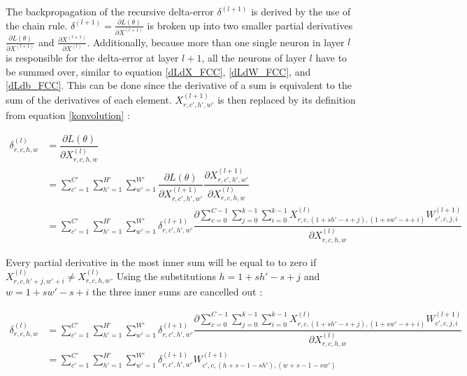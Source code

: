\documentclass[a4paper, twoside]{article}
\newcommand*{\pd}[2]{\ensuremath{\dfrac{\partial #1}{\partial #2}}}
\newcommand*{\inpd}[2]{\ensuremath{\frac{\partial #1}{\partial #2}}}
\begin{document}
The backpropagation of the recursive delta-error $\delta^{(l+1)}$ is derived by the use of the chain rule. $\delta^{(l+1)} = \inpd{L(\theta)}{X^{(l+1)}}$ is broken up into two smaller partial derivatives $\inpd{L(\theta)}{X^{(l+1)}}$ and $\inpd{X^{(l+1)}}{X^{(l)}}$. Additionally, because more than one single neuron in layer $l$ is responsible for the delta-error at layer $l+1$, all the neurons of layer $l$ have to be summed over, similar to equation \eqref{dLdX_FCC}, \eqref{dLdW_FCC}, and \eqref{dLdb_FCC}. This can be done since the derivative of a sum is equivalent to the sum of the derivatives of each element. $X^{(l+1)}_{r,c',h',w'}$ is then replaced by its definition from equation \eqref{konvolution} \cite{convmath} \cite{webconv1} \cite{webconv2} \cite{webconv3}: 

\begin{equation}\label{konvolutionbackprop}
\begin{split}
	\delta^{(l)}_{r,c,h,w}
		& = \pd{L(\theta)}{X^{(l)}_{r,c,h,w}} \\
		& = \sum^{C' }_{c'=1} \sum^{H' }_{h'=1} \sum^{W' }_{w'=1} \pd{L(\theta)}{X^{(l+1)}_{r,c',h',w'}} \pd{X^{(l+1)}_{r,c',h',w'}}{X^{(l)}_{r,c,h,w}} \\
		& = \sum^{C' }_{c'=1} \sum^{H' }_{h'=1} \sum^{W' }_{w'=1} \delta^{(l+1)}_{r,c',h',w'} \pd{\sum^{C-1 }_{c=0} \sum^{k-1 }_{j=0} \sum^{k-1 }_{i=0} X^{(l)}_{r, c, (1+sh'-s+j), (1+sw'-s+i)}W^{(l+1)}_{c', c, j, i}}{X^{(l)}_{r,c,h,w}}
\end{split}
\end{equation}

Every partial derivative in the most inner sum will be equal to to zero if $X^{(l)}_{r, c, h'+j, w'+i} \neq X^{(l)}_{r,c,h,w}$. Using the substitutions $h = 1+sh'-s+j$ and $w = 1+sw'-s+i$ the three inner sums are cancelled out \cite{webconv1} \cite{webconv2} \cite{webconv3}:

\begin{equation}
\begin{split}
	\delta^{(l)}_{r,c,h,w}
		& = \sum^{C' }_{c'=1} \sum^{H' }_{h'=1} \sum^{W' }_{w'=1} \delta^{(l+1)}_{r,c',h',w'} \pd{\sum^{C-1 }_{c=0} \sum^{k-1 }_{j=0} \sum^{k-1 }_{i=0} X^{(l)}_{r, c, (1+sh'-s+j), (1+sw'-s+i)}W^{(l+1)}_{c', c, j, i}}{X^{(l)}_{r,c,h,w}} \\
		& = \sum^{C' }_{c'=1} \sum^{H' }_{h'=1} \sum^{W' }_{w'=1} \delta^{(l+1)}_{r,c',h',w'} W^{(l+1)}_{c', c, (h+s-1-sh'), (w+s-1-sw')}     \\
\end{split}
\end{equation}
\end{document}
